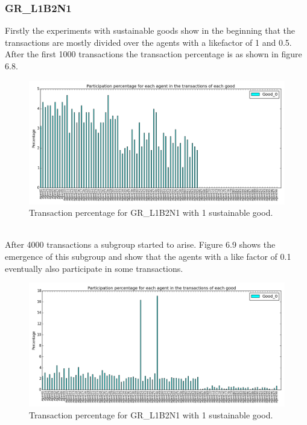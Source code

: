 \documentclass[twoside,openright]{uva-bachelor-thesis}
\begin{document}
\subsubsection{GR\_L1B2N1}
Firstly the experiments with sustainable goods show in the beginning that the transactions are mostly divided over the agents with a likefactor of 1 and 0.5. After the first 1000 transactions the transaction percentage is as shown in figure 6.8. \\
\begin{figure}[h!]
  \centering
   \includegraphics[scale=0.4]{Simulation2_figures/GR_L1B2N1/Figure1_1good_1k}
  \caption{Transaction percentage for GR\_L1B2N1 with 1 sustainable good.}
\end{figure}
 \\
After 4000 transactions a subgroup started to arise. Figure 6.9 shows the emergence of this subgroup and show that the agents with a like factor of 0.1 eventually also participate in some transactions. \\
\begin{figure}[h!]
  \centering
  \includegraphics[scale=0.4]{Simulation2_figures/GR_L1B2N1/Figure2_1good_4k} 
  \caption{Transaction percentage for GR\_L1B2N1 with 1 sustainable good.}
\end{figure}
\\
\end{document}
